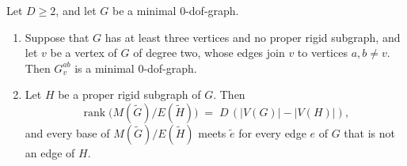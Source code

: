 \begin{lemma}
  \label{lem:reduction-step}
  \leanok
  Let $D \ge 2$, and let $G$ be a minimal $0$-dof-graph.
  \begin{enumerate}
    \item Suppose that $G$ has at least three vertices and no proper
      rigid subgraph, and let $v$ be a vertex of $G$ of degree two, whose
      edges join $v$ to vertices $a, b \neq v$. Then $G_v^{ab}$ is a
      minimal $0$-dof-graph.
    \item Let $H$ be a proper rigid subgraph of $G$. Then
      \[
        \operatorname{rank}\bigl(M(\tilde G)/E(\tilde H)\bigr) \;=\;
        D\,(|V(G)| - |V(H)|),
      \]
      and every base of $M(\tilde G)/E(\tilde H)$ meets $\tilde e$ for
      every edge $e$ of $G$ that is not an edge of $H$.
  \end{enumerate}
\end{lemma}
